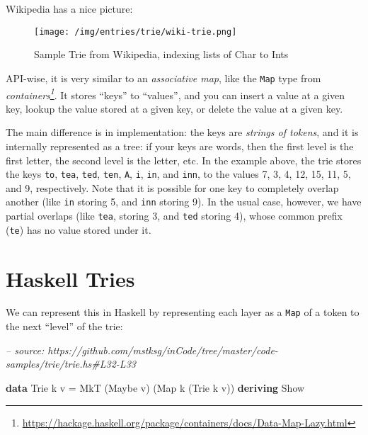 \documentclass[]{article}
\newenvironment{Shaded}{}{}
\newcommand{\CommentTok}[1]{\textcolor[rgb]{0.38,0.63,0.69}{\textit{#1}}}
\newcommand{\DataTypeTok}[1]{\textcolor[rgb]{0.56,0.13,0.00}{#1}}
\newcommand{\FunctionTok}[1]{\textcolor[rgb]{0.02,0.16,0.49}{#1}}
\newcommand{\KeywordTok}[1]{\textcolor[rgb]{0.00,0.44,0.13}{\textbf{#1}}}
\newcommand{\NormalTok}[1]{#1}
\renewcommand{\href}[2]{#2\footnote{\url{#1}}}
\begin{document}
Wikipedia has a nice picture:

\begin{figure}
\centering
\texttt{[image: /img/entries/trie/wiki-trie.png]}
\caption{Sample Trie from Wikipedia, indexing lists of Char to Ints}
\end{figure}

API-wise, it is very similar to an \emph{associative map}, like the \texttt{Map}
type from
\emph{\href{https://hackage.haskell.org/package/containers/docs/Data-Map-Lazy.html}{containers}}.
It stores ``keys'' to ``values'', and you can insert a value at a given key,
lookup the value stored at a given key, or delete the value at a given key.

The main difference is in implementation: the keys are \emph{strings of tokens},
and it is internally represented as a tree: if your keys are words, then the
first level is the first letter, the second level is the letter, etc. In the
example above, the trie stores the keys \texttt{to}, \texttt{tea}, \texttt{ted},
\texttt{ten}, \texttt{A}, \texttt{i}, \texttt{in}, and \texttt{inn}, to the
values 7, 3, 4, 12, 15, 11, 5, and 9, respectively. Note that it is possible for
one key to completely overlap another (like \texttt{in} storing 5, and
\texttt{inn} storing 9). In the usual case, however, we have partial overlaps
(like \texttt{tea}, storing 3, and \texttt{ted} storing 4), whose common prefix
(\texttt{te}) has no value stored under it.

\hypertarget{haskell-tries}{%
\section{Haskell Tries}\label{haskell-tries}}

We can represent this in Haskell by representing each layer as a \texttt{Map} of
a token to the next ``level'' of the trie:

\begin{Shaded}
\begin{Highlighting}[]
\CommentTok{-- source: https://github.com/mstksg/inCode/tree/master/code-samples/trie/trie.hs#L32-L33}

\KeywordTok{data} \DataTypeTok{Trie}\NormalTok{ k v }\FunctionTok{=} \DataTypeTok{MkT}\NormalTok{ (}\DataTypeTok{Maybe}\NormalTok{ v) (}\DataTypeTok{Map}\NormalTok{ k (}\DataTypeTok{Trie}\NormalTok{ k v))}
  \KeywordTok{deriving} \DataTypeTok{Show}
\end{Highlighting}
\end{Shaded}
\end{document}
